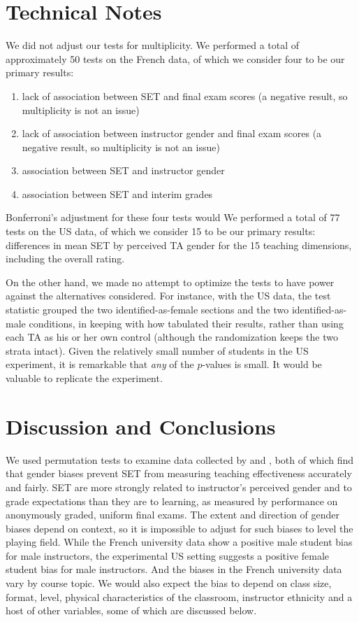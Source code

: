 \documentclass[12pt]{article}
\newcommand{\todo}[1]{{\color{red}{TO DO: \sc #1}}}
\begin{document}
\section{Technical Notes}
We did not adjust our tests for multiplicity.
We performed a total of approximately 50 tests on the French data, of which we
consider four to be our primary results:
\begin{enumerate}
    \item lack of association between SET and final exam scores (a negative result,
               so multiplicity is not an issue)
    \item lack of association between instructor gender and final exam scores (a negative result,
               so multiplicity is not an issue)
    \item association between SET and instructor gender
    \item association between SET and interim grades
\end{enumerate}        
Bonferroni's adjustment for these four tests would \todo{fix me when the results are in}
We performed a total of 77 tests on the US data, of which we consider
15 to be our primary results: differences in mean SET by perceived TA gender for
the 15 teaching dimensions, including the overall rating.

On the other hand, we made no attempt to optimize the tests to have power 
against the alternatives considered.
For instance, with the US data, the test statistic
grouped the two identified-as-female sections and the two identified-as-male conditions,
in keeping with how \citet{MacNell2014} tabulated their results,
rather than using each TA as his or her own control (although the randomization keeps the 
two strata intact). 
Given the relatively small number of students in the US experiment, it is remarkable that
\emph{any} of the $p$-values is small.
It would be valuable to replicate the experiment.

\section{Discussion and Conclusions}
We used permutation tests to examine data collected  by
\citet{Boring2015} and \citet{MacNell2014}, both of which find that gender biases prevent 
SET from measuring teaching effectiveness accurately and fairly. 
SET are more strongly related to instructor's perceived gender and to grade expectations 
than they are to learning, 
as measured by performance on anonymously graded, uniform final exams. 
The extent and direction of gender biases depend on context, so it is
impossible to adjust for such biases to level the playing field.
While the French university data show a positive male student bias for male instructors, 
the experimental US setting suggests a positive female student bias for male instructors.
And the biases in the French university data vary by course topic.
We would also expect the bias to depend on class size, format, level, physical characteristics
of the classroom, instructor ethnicity and a host of other variables, some of which
are discussed below.
\end{document}

